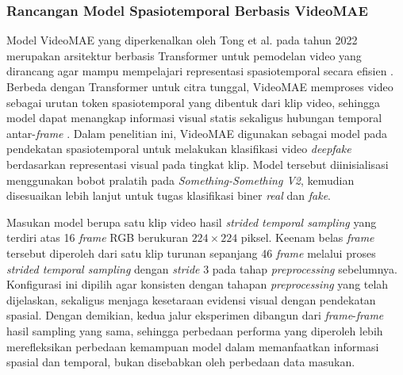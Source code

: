 \subsubsection{Rancangan Model Spasiotemporal Berbasis VideoMAE}
Model VideoMAE yang diperkenalkan oleh Tong et al. pada tahun 2022 merupakan arsitektur berbasis Transformer untuk pemodelan video yang dirancang agar mampu mempelajari representasi spasiotemporal secara efisien \cite{tong2022videomaemaskedautoencodersdataefficient}. Berbeda dengan Transformer untuk citra tunggal, VideoMAE memproses video sebagai urutan token spasiotemporal yang dibentuk dari klip video, sehingga model dapat menangkap informasi visual statis sekaligus hubungan temporal antar-\textit{frame} \cite{tong2022videomaemaskedautoencodersdataefficient}. Dalam penelitian ini, VideoMAE digunakan sebagai model pada pendekatan spasiotemporal untuk melakukan klasifikasi video \textit{deepfake} berdasarkan representasi visual pada tingkat klip. Model tersebut diinisialisasi menggunakan bobot pralatih pada \textit{Something-Something V2}, kemudian disesuaikan lebih lanjut untuk tugas klasifikasi biner \textit{real} dan \textit{fake}. \par

Masukan model berupa satu klip video hasil \textit{strided temporal sampling} yang terdiri atas 16 \textit{frame} RGB berukuran $224 \times 224$ piksel. Keenam belas \textit{frame} tersebut diperoleh dari satu klip turunan sepanjang 46 \textit{frame} melalui proses \textit{strided temporal sampling} dengan \textit{stride} 3 pada tahap \textit{preprocessing} sebelumnya. Konfigurasi ini dipilih agar konsisten dengan tahapan \textit{preprocessing} yang telah dijelaskan, sekaligus menjaga kesetaraan evidensi visual dengan pendekatan spasial. Dengan demikian, kedua jalur eksperimen dibangun dari \textit{frame}-\textit{frame} hasil sampling yang sama, sehingga perbedaan performa yang diperoleh lebih merefleksikan perbedaan kemampuan model dalam memanfaatkan informasi spasial dan temporal, bukan disebabkan oleh perbedaan data masukan. \par

